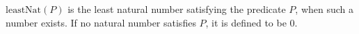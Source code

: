 \(\mathrm{leastNat}(P)\) is the least natural number satisfying the
predicate \(P\), when such a number exists.  If no natural number satisfies
\(P\), it is defined to be \(0\).
